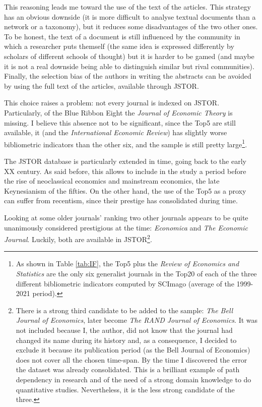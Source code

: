 \documentclass[a4paper, 11pt, headings=standardclasses, tablecaptionsbelow]{scrartcl}
\begin{document}
This reasoning leads me toward the use of the text of the articles. This strategy has an obvious downside (it is more difficult to analyse textual documents than a network or a taxonomy), but it reduces some disadvantages of the two other ones.
To be honest, the text of a document is still influenced by the community in which a researcher puts themself (the same idea is expressed differently by scholars of different schools of thought) but it is harder to be gamed (and maybe it is not a real downside being able to distinguish similar but rival communities).
Finally, the selection bias of the authors in writing the abstracts can be avoided by using the full text of the articles, available through JSTOR.



This choice raises a problem: not every journal is indexed on JSTOR. Particularly, of the Blue Ribbon Eight the \textit{Journal of Economic Theory} is missing. I believe this absence not to be significant, since the Top5 are still available, it (and the \textit{International Economic Review}) has slightly worse bibliometric indicators than the other six, and the sample is still pretty large\footnote{As shown in Table \ref{tab:IF}, the Top5 plus the \textit{Review of Economics and Statistics} are the only six generalist journals in the Top20 of each of the three different bibliometric indicators computed by SCImago (average of the 1999-2021 period).}.

The JSTOR database is particularly extended in time, going back to the early XX century. As said before, this allows to include in the study a period before the rise of neoclassical economics and mainstream economics, the late Keynesianism of the fifties.
On the other hand, the use of the Top5 as a proxy can suffer from recentism, since their prestige has consolidated during time.

Looking at some older journals' ranking \parencite{billings1972,hawkins1973,liebowitz1984,malouin1987,moore1972,coats1971} two other journals appears to be quite unanimously considered prestigious at the time: \textit{Economica} and \textit{The Economic Journal}. Luckily, both are available in JSTOR\footnote{There is a strong third candidate to be added to the sample: \textit{The Bell Journal of Economics}, later become \textit{The RAND Journal of Economics}. It was not included because I, the author, did not know that the journal had changed its name during its history and, as a consequence, I decided to exclude it because its publication period (as the Bell Journal of Economics) does not cover all the chosen time-span. By the time I discovered the error the dataset was already consolidated. This is a brilliant example of path dependency in research and of the need of a strong domain knowledge to do quantitative studies. Nevertheless, it is the less strong candidate of the three.}.
\end{document}
